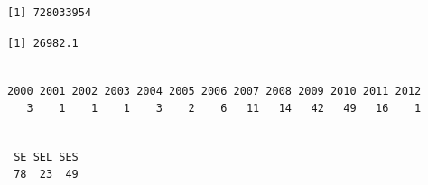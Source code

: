 \documentclass[
  letterpaper,
  DIV=11,
  numbers=noendperiod]{scrartcl}
\newenvironment{Shaded}{\begin{snugshade}}{\end{snugshade}}
\newcommand{\FunctionTok}[1]{\textcolor[rgb]{0.28,0.35,0.67}{#1}}
\newcommand{\NormalTok}[1]{\textcolor[rgb]{0.00,0.23,0.31}{#1}}
\newcommand{\SpecialCharTok}[1]{\textcolor[rgb]{0.37,0.37,0.37}{#1}}
\begin{document}
\begin{Shaded}
\end{Shaded}

\begin{verbatim}
[1] 728033954
\end{verbatim}

\begin{Shaded}
\end{Shaded}

\begin{verbatim}
[1] 26982.1
\end{verbatim}

\begin{Shaded}
\end{Shaded}

\begin{verbatim}

2000 2001 2002 2003 2004 2005 2006 2007 2008 2009 2010 2011 2012 
   3    1    1    1    3    2    6   11   14   42   49   16    1 
\end{verbatim}

\begin{Shaded}
\end{Shaded}

\begin{verbatim}

 SE SEL SES 
 78  23  49 
\end{verbatim}

\begin{Shaded}
\end{Shaded}
\end{document}
